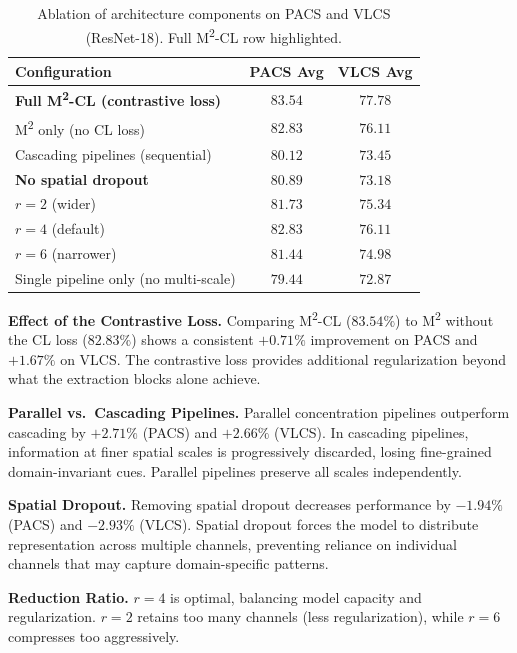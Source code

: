 \documentclass[12pt,a4paper]{article}
\newcommand{\tablehl}{\rowcolor{LightBlue!50}}
\newcommand{\highlight}[1]{\textcolor{AccentOrange}{\textbf{#1}}}
\newcommand{\good}[1]{\textcolor{GreenOK}{\textbf{#1}}}
\begin{document}
\begin{table}[H]
  \centering
  \caption{Ablation of architecture components on PACS and VLCS (ResNet-18).
  Full M\textsuperscript{2}-CL row highlighted.}
  \label{tab:ablation_arch}
  \begin{tabular}{@{}lcc@{}}
    \toprule
    \textbf{Configuration} & \textbf{PACS Avg} & \textbf{VLCS Avg} \\
    \midrule
    \tablehl
    \textbf{Full M\textsuperscript{2}-CL (contrastive loss)}
      & \good{$83.54$} & \good{$77.78$} \\
    M\textsuperscript{2} only (no CL loss)
      & $82.83$ & $76.11$ \\
    \midrule
    Cascading pipelines (sequential)
      & $80.12$ & $73.45$ \\
    \highlight{No spatial dropout}
      & $80.89$ & $73.18$ \\
    \midrule
    $r = 2$ (wider)    & $81.73$ & $75.34$ \\
    $r = 4$ (default)  & $82.83$ & $76.11$ \\
    $r = 6$ (narrower) & $81.44$ & $74.98$ \\
    \midrule
    Single pipeline only (no multi-scale)
      & $79.44$ & $72.87$ \\
    \bottomrule
  \end{tabular}
\end{table}

\textbf{Effect of the Contrastive Loss.}
Comparing M\textsuperscript{2}-CL ($83.54\%$) to M\textsuperscript{2} without the CL loss
($82.83\%$) shows a consistent $+0.71\%$ improvement on PACS and $+1.67\%$ on VLCS.
The contrastive loss provides additional regularization beyond what the extraction blocks
alone achieve.

\textbf{Parallel vs.\ Cascading Pipelines.}
Parallel concentration pipelines outperform cascading by $+2.71\%$ (PACS) and $+2.66\%$
(VLCS). In cascading pipelines, information at finer spatial scales is progressively
discarded, losing fine-grained domain-invariant cues. Parallel pipelines preserve all
scales independently.

\textbf{Spatial Dropout.}
Removing spatial dropout decreases performance by $-1.94\%$ (PACS) and $-2.93\%$ (VLCS).
Spatial dropout forces the model to distribute representation across multiple channels,
preventing reliance on individual channels that may capture domain-specific patterns.

\textbf{Reduction Ratio.}
$r{=}4$ is optimal, balancing model capacity and regularization. $r{=}2$ retains too
many channels (less regularization), while $r{=}6$ compresses too aggressively.
\end{document}
